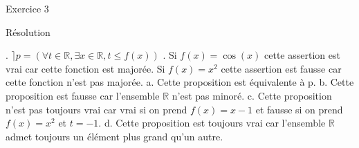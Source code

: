 \hypertarget{Exercice_3}{
\Huge{\begin{center}Exercice 3\end{center} \leavevmode\newline }}

\hypertarget{resolution}{%
\LARGE{Résolution}\label{resolution}}
\newline
{}. $\rceil p = (\forall t\in \mathbb{R}, \exists x \in \mathbb{R}, t \leq f(x))$
\newline
{}. Si $f(x) = \cos (x)$ cette assertion est vrai car cette fonction est majorée.
\newline
Si $f(x) = x^2$ cette assertion est fausse car cette fonction n'est pas majorée.
\newline
{}
\newline
\newline
a. Cette proposition est équivalente à p.
\newline
\newline
b. Cette proposition est fausse car l'ensemble $\mathbb{R}$ n'est pas minoré.
\newline
\newline
c. Cette proposition n'est pas toujours vrai car vrai si on prend $f(x) = x-1$ et fausse si on prend $f(x) = x^2$ et $t=-1$.
\newline
\newline
d. Cette proposition est toujours vrai car l'ensemble $\mathbb{R}$ admet toujours un élément plus grand qu'un autre.
